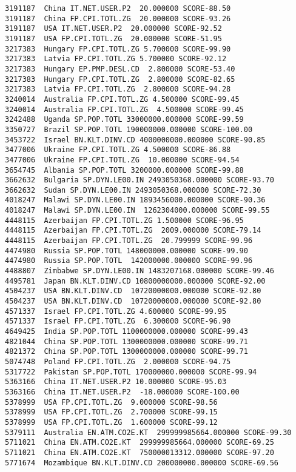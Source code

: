 \documentclass{pracjourn}
\begin{document}
\begin{lstlisting}
3191187  China IT.NET.USER.P2  20.000000 SCORE-88.50
3191187  China FP.CPI.TOTL.ZG  20.000000 SCORE-93.26
3191187  USA IT.NET.USER.P2  20.000000 SCORE-92.52
3191187  USA FP.CPI.TOTL.ZG  20.000000 SCORE-51.95
3217383  Hungary FP.CPI.TOTL.ZG 5.700000 SCORE-99.90
3217383  Latvia FP.CPI.TOTL.ZG 5.700000 SCORE-92.12
3217383  Hungary EP.PMP.DESL.CD  2.800000 SCORE-53.40
3217383  Hungary FP.CPI.TOTL.ZG  2.800000 SCORE-82.65
3217383  Latvia FP.CPI.TOTL.ZG  2.800000 SCORE-94.28
3240014  Australia FP.CPI.TOTL.ZG 4.500000 SCORE-99.45
3240014  Australia FP.CPI.TOTL.ZG  4.500000 SCORE-99.45
3242488  Uganda SP.POP.TOTL 33000000.000000 SCORE-99.59
3350727  Brazil SP.POP.TOTL 190000000.000000 SCORE-100.00
3453722  Israel BN.KLT.DINV.CD 4000000000.000000 SCORE-90.85
3477006  Ukraine FP.CPI.TOTL.ZG 4.500000 SCORE-86.88
3477006  Ukraine FP.CPI.TOTL.ZG  10.000000 SCORE-94.54
3654745  Albania SP.POP.TOTL 3200000.000000 SCORE-99.88
3662632  Bulgaria SP.DYN.LE00.IN 2493050368.000000 SCORE-93.70
3662632  Sudan SP.DYN.LE00.IN 2493050368.000000 SCORE-72.30
4018247  Malawi SP.DYN.LE00.IN 1893456000.000000 SCORE-90.36
4018247  Malawi SP.DYN.LE00.IN  1262304000.000000 SCORE-99.55
4448115  Azerbaijan FP.CPI.TOTL.ZG 1.500000 SCORE-96.95
4448115  Azerbaijan FP.CPI.TOTL.ZG  2009.000000 SCORE-79.14
4448115  Azerbaijan FP.CPI.TOTL.ZG  20.799999 SCORE-99.96
4474980  Russia SP.POP.TOTL 148000000.000000 SCORE-99.90
4474980  Russia SP.POP.TOTL  142000000.000000 SCORE-99.96
4488807  Zimbabwe SP.DYN.LE00.IN 1483207168.000000 SCORE-99.46
4495781  Japan BN.KLT.DINV.CD 10800000000.000000 SCORE-92.00
4504237  USA BN.KLT.DINV.CD  10720000000.000000 SCORE-92.80
4504237  USA BN.KLT.DINV.CD  10720000000.000000 SCORE-92.80
4571337  Israel FP.CPI.TOTL.ZG 4.600000 SCORE-99.95
4571337  Israel FP.CPI.TOTL.ZG  6.300000 SCORE-96.90
4649425  India SP.POP.TOTL 1100000000.000000 SCORE-99.43
4821044  China SP.POP.TOTL 1300000000.000000 SCORE-99.71
4821372  China SP.POP.TOTL 1300000000.000000 SCORE-99.71
5074748  Poland FP.CPI.TOTL.ZG  2.000000 SCORE-94.75
5317722  Pakistan SP.POP.TOTL 170000000.000000 SCORE-99.94
5363166  China IT.NET.USER.P2 10.000000 SCORE-95.03
5363166  China IT.NET.USER.P2  -18.000000 SCORE-100.00
5378999  USA FP.CPI.TOTL.ZG  9.000000 SCORE-98.56
5378999  USA FP.CPI.TOTL.ZG  2.700000 SCORE-99.15
5378999  USA FP.CPI.TOTL.ZG  1.600000 SCORE-99.12
5379111  Australia EN.ATM.CO2E.KT  299999985664.000000 SCORE-99.30
5711021  China EN.ATM.CO2E.KT  299999985664.000000 SCORE-69.25
5711021  China EN.ATM.CO2E.KT  750000013312.000000 SCORE-97.20
5771674  Mozambique BN.KLT.DINV.CD 200000000.000000 SCORE-69.56

\end{lstlisting}
\end{document}
